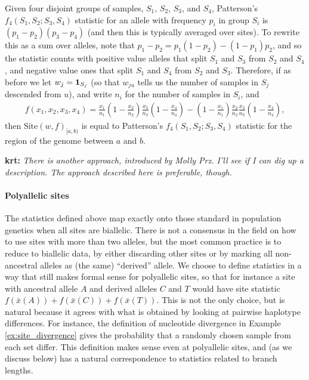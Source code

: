 \documentclass{article}
\newcommand{\site}{\mbox{Site}} %
\newcommand{\iw}{w} %
\newcommand{\aw}{{\bar x}} %
\newcommand{\krt}[1]{{\color{green}\textbf{krt:} \it #1}}
\begin{document}
\begin{example}[Patterson's $f_4$] \label{ex:site_f4}
    Given four disjoint groups of samples, $S_1$, $S_2$, $S_3$, and $S_4$,
    Patterson's $f_4(S_1, S_2; S_3, S_4)$ statistic for an allele with frequency $p_i$ in group $S_i$
    is $(p_1 - p_2)(p_3 - p_4)$ (and then this is typically averaged over sites).
    To rewrite this as a sum over alleles, note that
    $p_1 - p_2 = p_1 (1 - p_2) - (1 - p_1) p_2$,
    and so the statistic counts with positive value
    alleles that split $S_1$ and $S_3$ from $S_2$ and $S_4$,
    and negative value ones that split $S_1$ and $S_4$ from $S_2$ and $S_3$.
    Therefore, if as before we
    let $\iw_j = \bone_{S_j}$
    (so that $\iw_{ju}$ tells us the number of samples in $S_j$ descended from $u$),
    and write $n_i$ for the number of samples in $S_i$, and
    \begin{align*}
        f(x_1, x_2, x_3, x_4)
        =
        \frac{x_1}{n_1}
        \left(1 - \frac{x_2}{n_2}\right)
        \frac{x_3}{n_3}
        \left(1 - \frac{x_4}{n_4}\right)
        -
        \left(1 - \frac{x_1}{n_1}\right)
        \frac{x_2}{n_2}
        \frac{x_3}{n_3}
        \left(1 - \frac{x_4}{n_4}\right),
    \end{align*}
    then $\site(\iw, f)_{[a,b)}$ is equal to Patterson's $f_4(S_1, S_2; S_3, S_4)$ statistic
    for the region of the genome between $a$ and $b$.
\end{example}

\krt{There is another approach, introduced by Molly Prz.  I'll see if I can dig up a description.  The approach
described here is preferable, though.}


\paragraph{Polyallelic sites}
The statistics defined above map exactly onto those standard in population genetics
when all sites are biallelic.
There is not a consensus in the field
on how to use sites with more than two alleles, but the most common practice is
to reduce to biallelic data, by either discarding other sites
or by marking all non-ancestral alleles as (the same) ``derived'' allele.
We choose to define statistics in a way that still makes formal sense for polyallelic sites,
so that for instance a site with ancestral allele $A$ and derived alleles $C$ and $T$
would have site statistic $f(\aw(A)) + f(\aw(C)) + f(\aw(T))$.
This is not the only choice, but is natural because it agrees with what is obtained by
looking at pairwise haplotype differences.
For instance, the definition of nucleotide divergence in Example \ref{ex:site_divergence}
gives the probability that a randomly chosen sample from each set differ.
This definition makes sense even at polyallelic sites,
and (as we discuss below) has a natural correspondence to statistics related to branch lengths.
\end{document}
